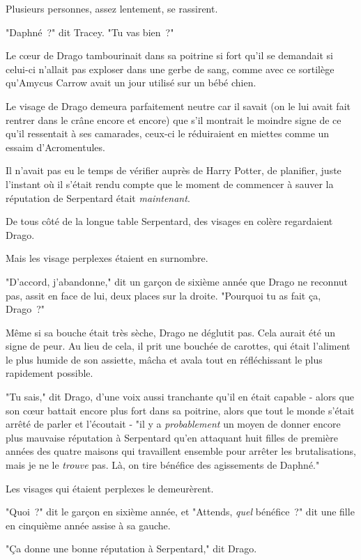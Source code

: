 Plusieurs personnes, assez lentement, se rassirent.

"Daphné~?" dit Tracey. "Tu vas bien~?"

\later

Le cœur de Drago tambourinait dans sa poitrine si fort qu'il se demandait si celui-ci n'allait pas exploser dans une gerbe de sang, comme avec ce sortilège qu'Amycus Carrow avait un jour utilisé sur un bébé chien.

Le visage de Drago demeura parfaitement neutre car il savait (on le lui avait fait rentrer dans le crâne encore et encore) que s'il montrait le moindre signe de ce qu'il ressentait à ses camarades, ceux-ci le réduiraient en miettes comme un essaim d'Acromentules.

Il n'avait pas eu le temps de vérifier auprès de Harry Potter, de planifier, juste l'instant où il s'était rendu compte que le moment de commencer à sauver la réputation de Serpentard était \emph{maintenant}.

De tous côté de la longue table Serpentard, des visages en colère regardaient Drago.

Mais les visage perplexes étaient en surnombre.

"D'accord, j'abandonne," dit un garçon de sixième année que Drago ne reconnut pas, assit en face de lui, deux places sur la droite. "Pourquoi tu as fait ça, Drago~?"

Même si sa bouche était très sèche, Drago ne déglutit pas. Cela aurait été un signe de peur. Au lieu de cela, il prit une bouchée de carottes, qui était l'aliment le plus humide de son assiette, mâcha et avala tout en réfléchissant le plus rapidement possible.

"Tu sais," dit Drago, d'une voix aussi tranchante qu'il en était capable - alors que son cœur battait encore plus fort dans sa poitrine, alors que tout le monde s'était arrêté de parler et l'écoutait - "il y a \emph{probablement} un moyen de donner encore plus mauvaise réputation à Serpentard qu'en attaquant huit filles de première années des quatre maisons qui travaillent ensemble pour arrêter les brutalisations, mais je ne le \emph{trouve} pas. Là, on tire bénéfice des agissements de Daphné."

Les visages qui étaient perplexes le demeurèrent.

"Quoi~?" dit le garçon en sixième année, et "Attends, \emph{quel} bénéfice~?" dit une fille en cinquième année assise à sa gauche.

"Ça donne une bonne réputation à Serpentard," dit Drago.

